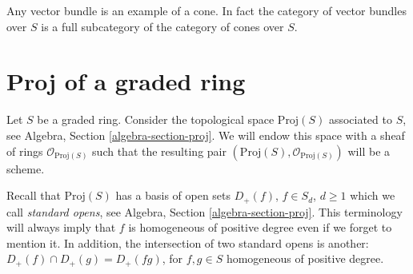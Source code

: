 \noindent
Any vector bundle is an example of a cone. In fact the category of
vector bundles over $S$ is a full subcategory of the category of cones
over $S$.










\section{Proj of a graded ring}
\label{section-proj}

\noindent
Let $S$ be a graded ring. Consider the topological space $\text{Proj}(S)$
associated to $S$, see Algebra, Section \ref{algebra-section-proj}.
We will endow this space with a sheaf of rings $\mathcal{O}_{\text{Proj}(S)}$
such that the resulting pair $(\text{Proj}(S), \mathcal{O}_{\text{Proj}(S)})$
will be a scheme.

\medskip\noindent
Recall that $\text{Proj}(S)$ has a basis of open sets $D_{+}(f)$,
$f \in S_d$, $d \geq 1$ which we call {\it standard opens}, see Algebra,
Section \ref{algebra-section-proj}. This terminology will always
imply that $f$ is homogeneous of positive degree even if we forget to
mention it. In addition, the intersection of two standard opens is another:
$D_{+}(f) \cap D_{+}(g) = D_{+}(fg)$, for $f, g \in S$ homogeneous of positive
degree.

